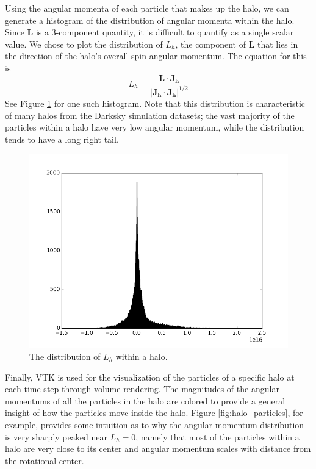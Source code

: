 \documentclass[12pt]{article}
\renewcommand{\vec}[1]{\mathbf{#1}}
\begin{document}
Using the angular momenta of each particle that makes up the halo, we can
generate a histogram of the distribution of angular momenta within the halo.
Since $\vec{L}$ is a 3-component quantity, it is difficult to quantify as
a single scalar value. We chose to plot the distribution of $L_h$, the
component of $\vec{L}$ that lies in the direction of the halo's overall spin
angular momentum. The equation for this is
\begin{equation}
L_h = \frac{\vec{L} \cdot \vec{J_h}}{|\vec{J_h} \cdot \vec{J_h}|^{1/2}}
\end{equation}
See Figure \ref{fig:actual_hist} for one such histogram. Note that this
distribution is characteristic of many halos from the Darksky simulation
datasets; the vast majority of the particles within a halo have very low
angular momentum, while the distribution tends to have a long right tail.

\begin{figure}[htp]
\centering
\includegraphics[width=0.5\columnwidth]{../figures/actual_angmom_histogram.png}
\caption{The distribution of $L_h$ within a halo.}
\label{fig:actual_hist}
\end{figure}

Finally, VTK is used for the visualization of the particles of a specific halo
at each time step through volume rendering. The magnitudes of the angular
momentums of all the particles in the halo are colored to provide a general
insight of how the particles move inside the halo. Figure
\ref{fig:halo_particles}, for example, provides some intuition as to why the
angular momentum distribution is very sharply peaked near $L_h = 0$, namely
that most of the particles within a halo are very close to its center and
angular momentum scales with distance from the rotational center.
\end{document}
